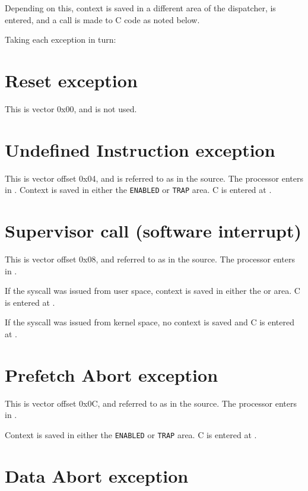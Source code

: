 \documentclass[a4paper,twoside]{report} %
\begin{document}
Depending on this, context is saved in a different area of the
dispatcher,  is entered, and a call is made to C code as
noted below. 

Taking each exception in turn:

\section{Reset exception}

This is vector 0x00, and is not used. 

\section{Undefined Instruction exception}

This is vector offset 0x04, and is referred to as 
 in the source.   
The processor enters  in .
Context is saved in either the \texttt{ENABLED} or \texttt{TRAP} area.
C is entered at . 

\section{Supervisor call (software interrupt)}

This is vector offset 0x08, and referred to as
 in the source. 
The processor enters  in .

If the syscall was issued from user space, context is saved in either
the  or  area.  C is entered at
.  

If the syscall was issued from kernel space, no context is saved and
C is entered at . 

\section{Prefetch Abort exception}

This is vector offset 0x0C, and referred to as
 in the source. 
The processor enters  in .

Context is saved in either the \texttt{ENABLED} or \texttt{TRAP} area.
C is entered at . 

\section{Data Abort exception}
\end{document}
